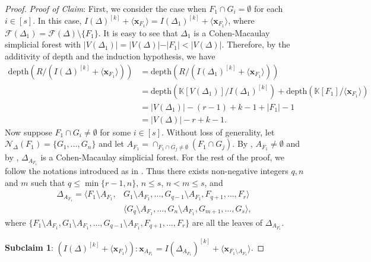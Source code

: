 \documentclass[12pt,a4paper,reqno]{amsart}
\theoremstyle{definition}
\def\K{\mathbb{K}}
\def\D{\Delta}
\def\F{\mathcal{F}}
\def\N{\mathcal{N}}
\def\d{\mathrm{depth}}
\def\l{\langle}
\def\r{\rangle}
\def\x{\mathbf x}
\begin{document}
\begin{proof}
\noindent
\textit{Proof of Claim}: 
    First, we consider the case when $F_1\cap G_i=\emptyset$ for each $i\in [s]$. In this case, $I(\Delta)^{[k]}+\l \x_{F_1}\r=I(\Delta_1)^{[k]}+\l \x_{F_1}\r$, where $\F(\Delta_1)=\F(\Delta)\setminus\{F_1\}$. It is easy to see that $\Delta_1$ is a Cohen-Macaulay simplicial forest with $\vert V(\D_1)\vert=\vert V(\D)\vert - \vert F_1\vert<\vert V(\D)\vert$. Therefore, by the additivity of depth \cite[Theorem 3.1.34]{RHV} and the induction hypothesis, we have
    \begin{align*}
        \d(R/(I(\Delta)^{[k]}+\l \x_{F_1}\r))&= \d(R/(I(\Delta_1)^{[k]}+\l \x_{F_1}\r))\\&=\d(\K[V(\D_1)]/I(\D_1)^{[k]})+\d(\K[F_1]/\l \x_{F_1}\r)\\ &=|V(\Delta_1)|-(r-1)+k-1+|F_1|-1\\
        &=|V(\Delta)|-r+k-1.
    \end{align*}
     Now suppose $F_1\cap G_i\neq\emptyset$ for some $i\in[s]$. Without loss of generality, let $\N_{\Delta}(F_1)=\{G_1,\ldots,G_n\}$ and let $A_{F_1}=\cap_{F_1\cap G_j\neq\emptyset}(F_1\cap G_j)$. By , $A_{F_1}\neq \emptyset$ and by , $\Delta_{A_{F_1}}$ is a Cohen-Macaulay simplicial forest. For the rest of the proof, we follow the notations introduced as in . Thus there exists non-negative integers $q,n$ and $m$ such that $ q\le \min\{r-1,n\}$, $ n\le s$, $n< m\le s$, and %
    \begin{equation}\label{Equation presentation}
    \begin{split}
    \Delta_{A_{F_1}}=\l F_1\setminus A_{F_1},&G_1\setminus A_{F_1},\ldots,G_{q-1}\setminus A_{F_1},F_{q+1},\ldots,F_r\r\\
    &\l G_{q}\setminus A_{F_1},\ldots,G_n\setminus A_{F_1},G_{m+1},\ldots,G_s\r,
   \end{split}
    \end{equation}
where $\{F_1\setminus A_{F_1},G_1\setminus A_{F_1},\ldots,G_{q-1}\setminus A_{F_1},F_{q+1},\ldots,F_r\}$ are all the leaves of $\D_{A_{F_1}}$.

    \noindent
\textbf{Subclaim 1}: $(I(\Delta)^{[k]}+\l \x_{F_1}\r):\x_{A_{F_1}}=I(\Delta_{A_{F_1}})^{[k]}+\l\x_{F_1\setminus A_{F_1}}\r$. 


\end{proof}
\end{document}
